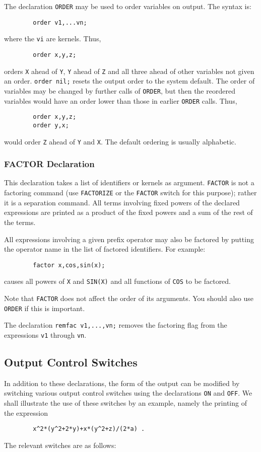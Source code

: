 The declaration {\tt ORDER} may be used to order variables
on output.  The syntax is:
\begin{verbatim}
        order v1,...vn;
\end{verbatim}
where the {\tt vi} are kernels.  Thus,
\begin{verbatim}
        order x,y,z;
\end{verbatim}
orders {\tt X} ahead of {\tt Y}, {\tt Y} ahead of {\tt Z} and all three
ahead of other variables not given an order. {\tt order nil;} resets the
output order to the system default.  The order of variables may be changed
by further calls of {\tt ORDER}, but then the reordered variables would
have an order lower than those in earlier {\tt ORDER} calls.
Thus,
\begin{verbatim}
        order x,y,z;
        order y,x;
\end{verbatim}
would order {\tt Z} ahead of {\tt Y} and {\tt X}.  The default ordering is
usually alphabetic.

\subsubsection{FACTOR Declaration}
\hypertarget{command:FACTOR}{}

This declaration takes a list of identifiers or kernels
as argument. {\tt FACTOR} is not a factoring command
(use {\tt FACTORIZE} or the {\tt FACTOR} switch for this purpose); rather it
is a separation command.  All terms involving fixed powers of the declared
expressions are printed as a product of the fixed powers and a sum of the
rest of the terms.

All expressions involving a given prefix operator may also be factored by
putting the operator name in the list of factored identifiers. For example:
\begin{verbatim}
        factor x,cos,sin(x);
\end{verbatim}
causes all powers of {\tt X} and {\tt SIN(X)} and all functions of
{\tt COS} to be factored.

Note that {\tt FACTOR} does not affect the order of its arguments.  You
should also use {\tt ORDER} if this is important.

\hypertarget{command:REMFAC}{}
The declaration {\tt remfac v1,...,vn;} removes the
factoring flag from the expressions {\tt v1} through {\tt vn}.

\subsection{Output Control Switches}
\label{sec-output}
In addition to these declarations, the form of the output can be modified
by switching various output control switches using the declarations
{\tt ON} and {\tt OFF}.  We shall illustrate the use of these switches by an
example, namely the printing of the expression
\begin{verbatim}
        x^2*(y^2+2*y)+x*(y^2+z)/(2*a) .
\end{verbatim}
The relevant switches are as follows:


